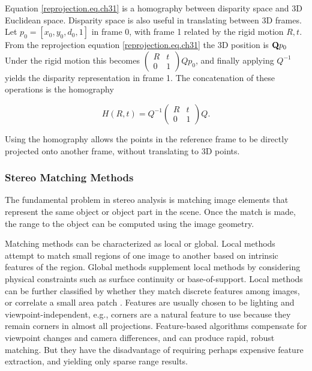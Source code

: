 \documentclass[twocolumn,oneside]{book}
\begin{document}
Equation \ref{reprojection.eq.ch31} is a homography between disparity
space and 3D Euclidean space.  Disparity space is also useful in
translating between 3D frames.  Let $p_0 = [x_0,y_0,d_0,1]$ in frame
0, with frame 1 related by the rigid motion $R,t$.  From the
reprojection equation
\ref{reprojection.eq.ch31} the 3D position is ${\bf Q}p_0$ Under the
rigid motion this becomes $\left(\begin{array}{cc}R&t\\ 0 & 1
\end{array}\right)Qp_0$, and finally applying $Q^{-1}$ yields the
disparity representation in frame 1.  The concatenation of these
operations is the homography 

\begin{equation}
H(R,t) = Q^{-1}\left(\begin{array}{cc}R&t
  \\ 0 & 1 \end{array}\right)Q.  
\label{homography.eq.ch31}
\end{equation}

\noindent Using the homography allows the points
in the reference frame to be directly projected onto another frame,
without translating to 3D points.

\subsubsection{Stereo Matching Methods}

The fundamental problem in stereo analysis is matching image elements
that represent the same object or object part in the scene.  Once the
match is made, the range to the object can be computed using the image
geometry.

Matching methods can be characterized as local or global.  Local
methods attempt to match small regions of one image to another based
on intrinsic features of the region.  Global methods supplement local
methods by considering physical constraints such as surface continuity
or base-of-support.  Local methods can be further classified by
whether they match discrete features among images, or correlate a
small area patch \cite{barnard1982}.  Features are usually
chosen to be lighting and viewpoint-independent, e.g., corners are a
natural feature to use because they remain corners in almost all
projections.  Feature-based algorithms compensate for viewpoint
changes and camera differences, and can produce rapid, robust
matching. But they have the disadvantage of requiring perhaps
expensive feature extraction, and yielding only sparse range results.
\end{document}
